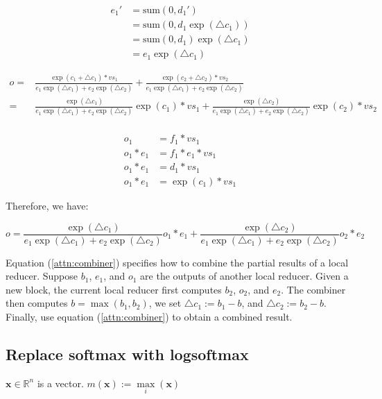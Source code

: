 \begin{align*}
  e_1'&=\text{sum}(0, d_1') \\
  &=\text{sum}(0, d_1\exp(\triangle c_1)) \\
  &=\text{sum}(0, d_1)\exp(\triangle c_1) \\
  &=e_1 \exp(\triangle c_1)
\end{align*}

\begin{align*}
o =& \frac{\exp (c_1 + \triangle c_1)*vs_1}{e_1 \exp(\triangle c_1)+ e_2 \exp(\triangle c_2)}+\frac{\exp (c_2 + \triangle c_2)*vs_2}{e_1 \exp(\triangle c_1)+ e_2 \exp(\triangle c_2)} \\
=& \frac{\exp(\triangle c_1)}{e_1 \exp(\triangle c_1)+ e_2 \exp(\triangle c_2)}\exp (c_1)*vs_1 +\frac{\exp (\triangle c_2)}{e_1 \exp(\triangle c_1)+ e_2 \exp(\triangle c_2)}\exp(c_2)*vs_2\\
\end{align*}

\begin{align*}
o_1 &= f_1 *vs_1 \\
o_1 * e_1 & = f_1 * e_1 * vs_1 \\
o_1 *e_1&=d_1 * vs_1\\
o_1 *e_1 &= \exp(c_1) * vs_1
\end{align*}

Therefore, we have:

\begin{equation}
o= \frac{\exp(\triangle c_1)}{e_1 \exp(\triangle c_1)+ e_2 \exp(\triangle c_2)}o_1*e_1 +\frac{\exp (\triangle c_2)}{e_1 \exp(\triangle c_1)+ e_2 \exp(\triangle c_2)}o_2*e_2 \label{attn:combiner}
\end{equation}

Equation (\ref{attn:combiner}) specifies how to combine the partial results of a local reducer. Suppose $b_1$, $e_1$, and $o_1$ are the outputs of another local reducer. Given a new block, the current local reducer first computes $b_2$, $o_2$, and $e_2$. The combiner then computes $b = \max(b_1, b_2)$, we set $\triangle c_1 := b_1 - b$, and $\triangle c_2 := b_2 - b$. Finally, use equation (\ref{attn:combiner}) to obtain a combined result.

\newpage
\subsection{Replace softmax with logsoftmax}

$\mathbf{x}\in\mathbb{R}^n$ is a vector.
$m(\mathbf{x}) := \max\limits_i(\mathbf{x})$

